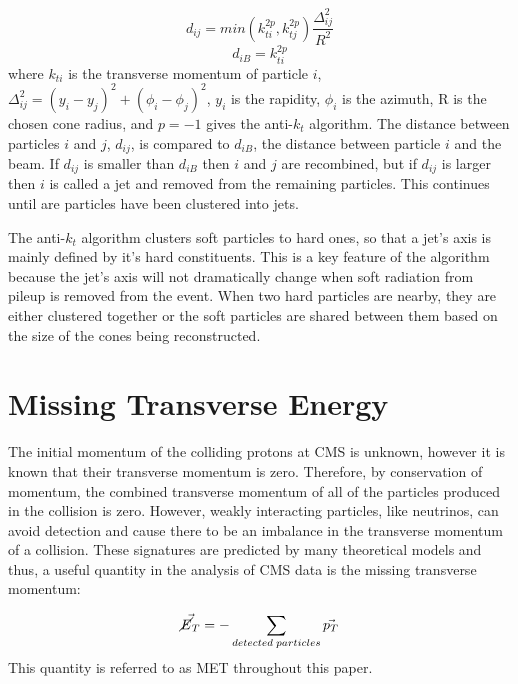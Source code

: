 \begin{equation}
d_{ij}=min(k_{ti}^{2p},k_{tj}^{2p})\frac{\Delta_{ij}^{2}}{R^{2}}
\end{equation}
\begin{equation}
d_{iB} = k_{ti}^{2p}
\end{equation}
where $k_{ti}$ is the transverse momentum of particle $i$, $\Delta_{ij}^{2} = (y_{i}-y_{j})^{2}+(\phi_{i}-\phi_{j})^{2}$, $y_{i}$ is the rapidity, $\phi_{i}$ is the azimuth, R is the chosen cone radius, and $p=-1$ gives the anti-$k_{t}$ algorithm. The distance between particles $i$ and $j$, $d_{ij}$, is compared to $d_{iB}$, the distance between particle $i$ and the beam. If $d_{ij}$ is smaller than $d_{iB}$ then $i$ and $j$ are recombined, but if $d_{ij}$ is larger then $i$ is called a jet and removed from the remaining particles. This continues until are particles have been clustered into jets.

The anti-$k_{t}$ algorithm clusters soft particles to hard ones, so that a jet's axis is mainly defined by it's hard constituents. This is a key feature of the algorithm because the jet's axis will not dramatically change when soft radiation from pileup is removed from the event. When two hard particles are nearby, they are either clustered together or the soft particles are shared between them based on the size of the cones being reconstructed. 

\section{Missing Transverse Energy}

The initial momentum of the colliding protons at CMS is unknown, however it is known that their transverse momentum is zero. Therefore, by conservation of momentum, the combined transverse momentum of all of the particles produced in the collision is zero. However, weakly interacting particles, like neutrinos, can avoid detection and cause there to be an imbalance in the transverse momentum of a collision. These signatures are predicted by many theoretical models and thus, a useful quantity in the analysis of CMS data is the missing transverse momentum:

\begin{equation}
\vec{\cancel{E}_{T}}= -\sum_{detected\;particles} \vec{p_{T}}
\end{equation}
This quantity is referred to as MET throughout this paper.

